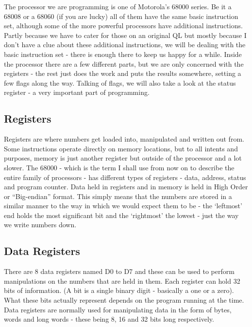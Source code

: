 The processor we are programming is one of Motorola's 68000 series.
    Be it a 68008 or a 68060 (if you are lucky) all of them have the same
    basic instruction set, although some of the more powerful processors have
    additional instructions. Partly because we have to cater for those on an
    original QL but mostly because I don't have a clue about these additional
    instructions, we will be dealing with the basic instruction set -{} there is
    enough there to keep us happy for a while. Inside the processor there are
    a few different parts, but we are only concerned with the registers -{} the
    rest just does the work and puts the results somewhere, setting a few
    flags along the way. Talking of flags, we will also take a look at the
    status register -{} a very important part of programming.

\subsection{Registers}

Registers are where numbers get loaded into, manipulated and
      written out from. Some instructions operate directly on memory
      locations, but to all intents and purposes, memory is just another
      register but outside of the processor and a lot slower. The 68000 -{}
      which is the term I shall use from now on to describe the entire family
      of processors -{} has different types of registers -{} data, address, status
      and program counter. Data held in registers and in memory is held in
      High Order or ``Big-endian'' format. This simply means that the numbers are stored in a
      similar manner to the way in which we would expect them to be -{} the
      `leftmost' end holds the most significant bit and the `rightmost' the
      lowest -{} just the way we write numbers down.

\subsection{Data Registers}

There are 8 data registers named D0 to D7 and these can be used to
      perform manipulations on the numbers that are held in them. Each
      register can hold 32 bits of information. (A bit is a single binary
      digit -{} basically a one or a zero). What these bits actually represent
      depends on the program running at the time. Data registers are normally
      used for manipulating data in the form of bytes, words and long words -{}
      these being 8, 16 and 32 bits long respectively.


